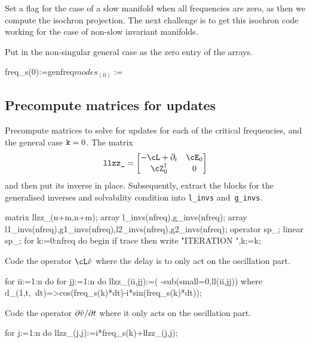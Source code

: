 \documentclass[11pt,a5paper]{article}
\newcommand{\adj}[1]{#1^\dagger} %
\begin{document}
Set a flag for the case of a slow manifold when all frequencies are zero, as then we compute the isochron projection.
The next challenge is to get this isochron code working for the case of non-slow invariant manifolds.

Put in the non-singular general case as the zero entry of the arrays.

\begin{reduce}
freq_s(0):=genfreq$
modes_(0):={}$
\end{reduce}





\subsection{Precompute matrices for updates}

Precompute matrices to solve for updates for each of the critical frequencies, and the general case $\verb|k|=0$.
The matrix 
\begin{equation*}
\verb|llzz_| = \begin{bmatrix} -\cL+\partial_t & \cE_0 
\\ \adj\cZ_0 & 0 \end{bmatrix}
\end{equation*}
and then put its inverse in place.
Subsequently, extract the blocks for the generalised inverses and solvability condition into \verb|l_invs| and~\verb|g_invs|.

\begin{reduce}
matrix llzz_(n+m,n+m);
array l_invs(nfreq),g_invs(nfreq);
array l1_invs(nfreq),g1_invs(nfreq),l2_invs(nfreq),g2_invs(nfreq);
operator sp_; linear sp_;
for k:=0:nfreq do begin
  if trace then write "ITERATION ",k:=k; 
\end{reduce}

Code the operator \(\cL\hat v\) where the delay is to only act on the oscillation part.
\begin{reduce}
  for ii:=1:n do for jj:=1:n do llzz_(ii,jj):=(
      -sub(small=0,ll(ii,jj))
      where d_(1,t,~dt)=>cos(freq_s(k)*dt)-i*sin(freq_s(k)*dt));
\end{reduce}

Code the operator \(\D t{\hat v}\) where it only acts on the oscillation part.
\begin{reduce}
  for j:=1:n do llzz_(j,j):=i*freq_s(k)+llzz_(j,j);
\end{reduce}
\end{document}
